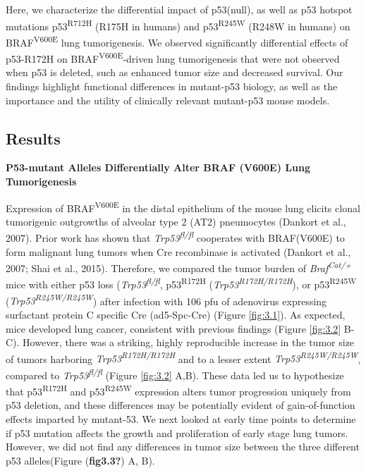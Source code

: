 Here, we characterize the differential impact of p53(null), as well as p53 hotspot mutations p53\textsuperscript{R712H} (R175H in humans) and p53\textsuperscript{R245W} (R248W in humans) on BRAF\textsuperscript{V600E} lung tumorigenesis. We observed significantly differential effects of p53-R172H on BRAF\textsuperscript{V600E}-driven lung tumorigenesis that were not observed when p53 is deleted, such as enhanced tumor size and decreased survival. Our findings highlight functional differences in mutant-p53 biology, as well as the importance and the utility of clinically relevant mutant-p53 mouse models.

\hypertarget{results-1}{%
\subsection{Results}\label{results-1}}

\textbf{P53-mutant Alleles Differentially Alter BRAF (V600E) Lung Tumorigenesis}

Expression of BRAF\textsuperscript{V600E} in the distal epithelium of the mouse lung elicits clonal tumorigenic outgrowths of alveolar type 2 (AT2) pneumocytes (Dankort et al., 2007). Prior work has shown that \emph{Trp53\textsuperscript{fl/fl}} cooperates with BRAF(V600E) to form malignant lung tumors when Cre recombinase is activated (Dankort et al., 2007; Shai et al., 2015). Therefore, we compared the tumor burden of \emph{Braf\textsuperscript{Cat/+}} mice with either p53 loss (\emph{Trp53\textsuperscript{fl/fl}}, p53\textsuperscript{R172H} (\emph{Trp53\textsuperscript{R172H/R172H}}), or p53\textsuperscript{R245W} (\emph{Trp53\textsuperscript{R245W/R245W}}) after infection with 106 pfu of adenovirus expressing surfactant protein C specific Cre (ad5-Spc-Cre) (Figure \ref{fig:3.1}). As expected, mice developed lung cancer, consistent with previous findings (Figure \ref{fig:3.2} B-C). However, there was a striking, highly reproducible increase in the tumor size of tumors harboring \emph{Trp53\textsuperscript{R172H/R172H}} and to a lesser extent \emph{Trp53\textsuperscript{R245W/R245W}}, compared to \emph{Trp53\textsuperscript{fl/fl}} (Figure \ref{fig:3.2} A,B). These data led us to hypothesize that p53\textsuperscript{R172H} and p53\textsuperscript{R245W} expression alters tumor progression uniquely from p53 deletion, and these differences may be potentially evident of gain-of-function effects imparted by mutant-53. We next looked at early time points to determine if p53 mutation affects the growth and proliferation of early stage lung tumors. However, we did not find any differences in tumor size between the three different p53 alleles(Figure (\textbf{fig3.3?}) A, B).

